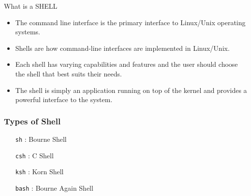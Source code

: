 \documentclass[10pt,t]{beamer}
\begin{document}
\begin{frame}[allowframebreaks]
\begin{exampleblock}{What is a SHELL}
    \begin{itemize}
      \item The command line interface is the primary interface to Linux/Unix operating systems.
      \item Shells are how command-line interfaces are implemented in Linux/Unix.
      \item Each shell has varying capabilities and features and the user should choose the shell that best suits their needs.
      \item The shell is simply an application running on top of the kernel and provides a powerful interface to the system.
    \end{itemize}
  \end{exampleblock}
\end{frame}

\begin{frame}
  \frametitle{Types of Shell}
    \begin{itemize}
      \item[\texttt{sh}]: Bourne Shell
      \item[\texttt{csh}]: C Shell
      \item[\texttt{ksh}]: Korn Shell
      \item[\texttt{bash}]: Bourne Again Shell
\end{itemize}
\end{frame}
\end{document}

